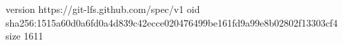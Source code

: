version https://git-lfs.github.com/spec/v1
oid sha256:1515a60d0a6fd0a4d839c42ecce020476499be161fd9a99e8b02802f13303cf4
size 1611

